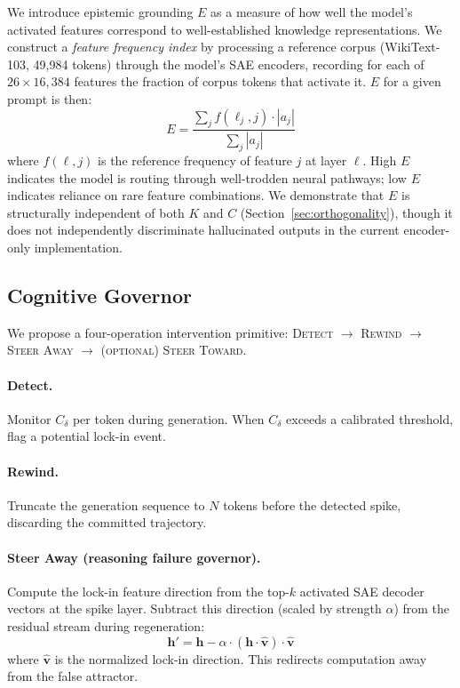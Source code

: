 \documentclass{article}
\begin{document}
We introduce epistemic grounding $E$ as a measure of how well the model's activated features correspond to well-established knowledge representations. We construct a \emph{feature frequency index} by processing a reference corpus (WikiText-103, 49{,}984 tokens) through the model's SAE encoders, recording for each of $26 \times 16{,}384$ features the fraction of corpus tokens that activate it. $E$ for a given prompt is then:
\begin{equation}
E = \frac{\sum_{j} f(\ell_j, j) \cdot |a_j|}{\sum_{j} |a_j|}
\end{equation}
where $f(\ell, j)$ is the reference frequency of feature $j$ at layer $\ell$. High $E$ indicates the model is routing through well-trodden neural pathways; low $E$ indicates reliance on rare feature combinations. We demonstrate that $E$ is structurally independent of both $K$ and $C$ (Section~\ref{sec:orthogonality}), though it does not independently discriminate hallucinated outputs in the current encoder-only implementation.

\subsection{Cognitive Governor}

We propose a four-operation intervention primitive: \textsc{Detect} $\rightarrow$ \textsc{Rewind} $\rightarrow$ \textsc{Steer Away} $\rightarrow$ \textsc{(optional) Steer Toward}.

\paragraph{Detect.} Monitor $C_\delta$ per token during generation. When $C_\delta$ exceeds a calibrated threshold, flag a potential lock-in event.

\paragraph{Rewind.} Truncate the generation sequence to $N$ tokens before the detected spike, discarding the committed trajectory.

\paragraph{Steer Away (reasoning failure governor).} Compute the lock-in feature direction from the top-$k$ activated SAE decoder vectors at the spike layer. Subtract this direction (scaled by strength $\alpha$) from the residual stream during regeneration:
\begin{equation}
\mathbf{h}' = \mathbf{h} - \alpha \cdot (\mathbf{h} \cdot \hat{\mathbf{v}}) \cdot \hat{\mathbf{v}}
\end{equation}
where $\hat{\mathbf{v}}$ is the normalized lock-in direction. This redirects computation away from the false attractor.
\end{document}
